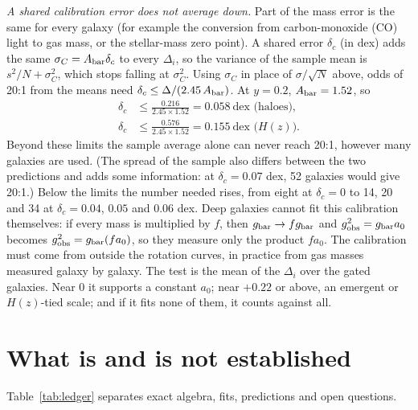 \documentclass[fleqn,usenatbib]{mnras}
\begin{document}
\emph{A shared calibration error does not average down.} Part of the mass error is the same for every galaxy (for example the conversion from carbon-monoxide (CO) light to gas mass, or the stellar-mass zero point). A shared error $\delta_c$ (in dex) adds the same $\sigma_C=A_{\rm bar}\delta_c$ to every $\Delta_i$, so the variance of the sample mean is $s^2/N+\sigma_C^2$, which stops falling at $\sigma_C^2$. Using $\sigma_C$ in place of $\sigma/\sqrt N$ above, odds of 20:1 from the means need $\delta_c\le\Delta/(2.45\,A_{\rm bar})$. At $y=0.2$, $A_{\rm bar}=1.52$, so
\begin{equation}
\begin{aligned}
\delta_c&\le\frac{0.216}{2.45\times1.52}=0.058\ \text{dex (haloes)},\\
\delta_c&\le\frac{0.576}{2.45\times1.52}=0.155\ \text{dex ($H(z)$)}.
\end{aligned}
\end{equation}
Beyond these limits the sample average alone can never reach 20:1, however many galaxies are used. (The spread of the sample also differs between the two predictions and adds some information: at $\delta_c=0.07$ dex, 52 galaxies would give 20:1.) Below the limits the number needed rises, from eight at $\delta_c=0$ to 14, 20 and 34 at $\delta_c=0.04$, $0.05$ and $0.06$ dex. Deep galaxies cannot fit this calibration themselves: if every mass is multiplied by $f$, then $g_{\rm bar}\to fg_{\rm bar}$ and $g_{\rm obs}^2=g_{\rm bar}a_0$ becomes $g_{\rm obs}^2=g_{\rm bar}(fa_0)$, so they measure only the product $fa_0$. The calibration must come from outside the rotation curves, in practice from gas masses measured galaxy by galaxy. The test is the mean of the $\Delta_i$ over the gated galaxies. Near 0 it supports a constant $a_0$; near $+0.22$ or above, an emergent or $H(z)$-tied scale; and if it fits none of them, it counts against all.

\section{What is and is not established}
\label{sec:limits}
Table~\ref{tab:ledger} separates exact algebra, fits, predictions and open questions.
\end{document}
